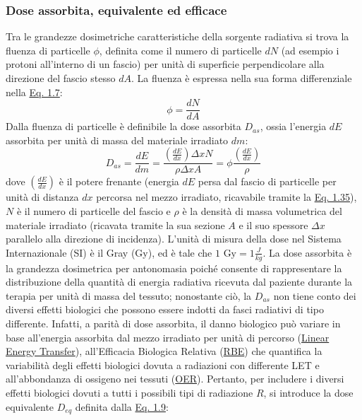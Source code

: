 \documentclass[12pt,a4paper,twoside]{report}
\begin{document}
	\subsubsection{Dose assorbita, equivalente ed efficace}
	Tra le grandezze dosimetriche caratteristiche della sorgente radiativa si trova la fluenza di particelle $\phi$, definita come il numero di particelle $dN$ (ad esempio i protoni all'interno di un fascio) per unità di superficie perpendicolare alla direzione del fascio stesso $dA$. La fluenza è espressa nella sua forma differenziale nella \hyperref[eq:fluence]{Eq. 1.7}:
	\begin{equation}
		\phi=\frac{dN}{dA}
		\label{eq:fluence}
	\end{equation}
	Dalla fluenza di particelle è definibile la dose assorbita $D_{as}$, ossia l'energia $dE$ assorbita per unità di massa del materiale irradiato $dm$:
	\begin{equation}
		D_{as}=\frac{dE}{dm}=\frac{\left(\frac{dE}{dx}\right)\Delta x N}{\rho \Delta x A}=\phi\frac{\left(\frac{dE}{dx}\right)}{\rho}
		\label{eq:dose_as}
	\end{equation}
	dove $\left(\frac{dE}{dx}\right)$ è il potere frenante (energia $dE$ persa dal fascio di particelle per unità di distanza $dx$ percorsa nel mezzo irradiato, ricavabile tramite la \hyperref[eq:bethe_bloch]{Eq. 1.35}), $N$ è il numero di particelle del fascio e $\rho$ è la densità di massa volumetrica del materiale irradiato (ricavata tramite la sua sezione $A$ e il suo spessore $\Delta x$ parallelo alla direzione di incidenza). L'unità di misura della dose nel Sistema Internazionale (SI) è il Gray (Gy), ed è tale che $1\mbox{ Gy}=1\frac{J}{kg}$. La dose assorbita è la grandezza dosimetrica per antonomasia poiché consente di rappresentare la distribuzione della quantità di energia radiativa ricevuta dal paziente durante la terapia per unità di massa del tessuto; nonostante ciò, la $D_{as}$ non tiene conto dei diversi effetti biologici che possono essere indotti da fasci radiativi di tipo differente. Infatti, a parità di dose assorbita, il danno biologico può variare in base all'energia assorbita dal mezzo irradiato per unità di percorso (\hyperref[par:let]{Linear Energy Transfer}), all'Efficacia Biologica Relativa (\hyperref[par:rbe]{RBE}) che quantifica la variabilità degli effetti biologici dovuta a radiazioni con differente LET e all'abbondanza di ossigeno nei tessuti (\hyperref[par:oer]{OER}). Pertanto, per includere i diversi effetti biologici dovuti a tutti i possibili tipi di radiazione $R$, si introduce la dose equivalente $D_{eq}$ definita dalla \hyperref[eq:dose_eq]{Eq. 1.9}:
\end{document}
